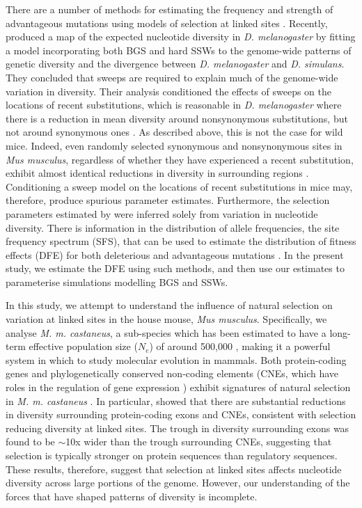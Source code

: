 	There are a number of methods for estimating the frequency and strength of advantageous mutations using models of selection at linked sites \citep{RN352}. Recently, \cite{RN274} produced a map of the expected nucleotide diversity in \textit{D. melanogaster} by fitting a model incorporating both BGS and hard SSWs to the genome-wide patterns of genetic diversity and the divergence between \textit{D. melanogaster} and \textit{D. simulans}. They concluded that sweeps are required to explain much of the genome-wide variation in diversity. Their analysis conditioned the effects of sweeps on the locations of recent substitutions, which is reasonable in \textit{D. melanogaster} where there is a reduction in mean diversity around nonsynonymous substitutions, but not around synonymous ones \citep{RN274}. As described above, this is not the case for wild mice. Indeed, even randomly selected synonymous and nonsynonymous sites in \textit{Mus musculus}, regardless of whether they have experienced a recent substitution, exhibit almost identical reductions in diversity in surrounding regions \citep{RN122}. Conditioning a sweep model on the locations of recent substitutions in mice may, therefore, produce spurious parameter estimates. Furthermore, the selection parameters estimated by \cite{RN274} were inferred solely from variation in nucleotide diversity. There is information in the distribution of allele frequencies, the site frequency spectrum (SFS), that can be used to estimate the distribution of fitness effects (DFE) for both deleterious and advantageous mutations \citep{RN164, RN201, RN210, RN354}. In the present study, we estimate the DFE using such methods, and then use our estimates to parameterise simulations modelling BGS and SSWs.

	In this study, we attempt to understand the influence of natural selection on variation at linked sites in the house mouse, \textit{Mus musculus}. Specifically, we analyse \textit{M. m. castaneus}, a sub-species which has been estimated to have a long-term effective population size ($N_e$) of around 500,000 \citep{RN233, RN158}, making it a powerful system in which to study molecular evolution in mammals. Both protein-coding genes and phylogenetically conserved non-coding elements (CNEs, which have roles in the regulation of gene expression \citep{RN353}) exhibit signatures of natural selection in \textit{M. m. castaneus} \citep{RN122}. In particular, \cite{RN122} showed that there are substantial reductions in diversity surrounding protein-coding exons and CNEs, consistent with selection reducing diversity at linked sites. The trough in diversity surrounding exons was found to be $\sim$10x wider than the trough surrounding CNEs, suggesting that selection is typically stronger on protein sequences than regulatory sequences. These results, therefore, suggest that selection at linked sites affects nucleotide diversity across large portions of the genome. However, our understanding of the forces that have shaped patterns of diversity is incomplete.

